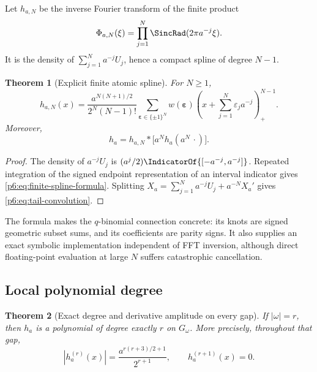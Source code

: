 \documentclass[11pt,oneside]{article}
\numberwithin{equation}{section}
\newtheorem{theorem}{Theorem}[section]
\theoremstyle{definition}
\theoremstyle{remark}
\begin{document}
Let $h_{a,N}$ be the inverse Fourier transform of the finite product
\begin{equation}\label{p6:eq:Phi-a-N}
 \Phi_{a,N}(\xi)=\prod_{j=1}^{N}
 \SincRad(2\pi a^{-j}\xi).
\end{equation}
It is the density of $\sum_{j=1}^{N}a^{-j}U_j$, hence a compact spline of degree
$N-1$.

\begin{theorem}[Explicit finite atomic spline]\label{p6:thm:finite-spline}
For $N\ge1$,
\begin{equation}\label{p6:eq:finite-spline-formula}
 h_{a,N}(x)=
 \frac{a^{N(N+1)/2}}{2^N(N-1)!}
 \sum_{\boldsymbol\varepsilon\in\{\pm1\}^N}
 w(\boldsymbol\varepsilon)
 \left(x+\sum_{j=1}^{N}\varepsilon_ja^{-j}\right)_+^{N-1}.
\end{equation}
Moreover,
\begin{equation}\label{p6:eq:tail-convolution}
 h_a=h_{a,N}*\bigl[a^Nh_a(a^N\,\cdot)\bigr].
\end{equation}
\end{theorem}

\begin{proof}
The density of $a^{-j}U_j$ is
$(a^j/2)\IndicatorOf{[-a^{-j},a^{-j}]}$.  Repeated integration of the signed endpoint
representation of an interval indicator gives
\eqref{p6:eq:finite-spline-formula}.  Splitting
$X_a=\sum_{j=1}^{N}a^{-j}U_j+a^{-N}X_a'$ gives
\eqref{p6:eq:tail-convolution}.
\end{proof}

The formula makes the $q$-binomial connection concrete: its knots are signed
geometric subset sums, and its coefficients are parity signs.  It also supplies
an exact symbolic implementation independent of FFT inversion, although direct
floating-point evaluation at large $N$ suffers catastrophic cancellation.

\subsection{Local polynomial degree}

\begin{theorem}[Exact degree and derivative amplitude on every gap]
\label{p6:prop:polynomial-gap}
If $|\omega|=r$, then $h_a$ is a polynomial of degree exactly $r$ on
$G_\omega$.  More precisely, throughout that gap,
\begin{equation}\label{p6:eq:gap-leading-derivative}
 \left|h_a^{(r)}(x)\right|
 =\frac{a^{r(r+3)/2+1}}{2^{r+1}},
 \qquad h_a^{(r+1)}(x)=0.
\end{equation}
\end{theorem}
\end{document}
